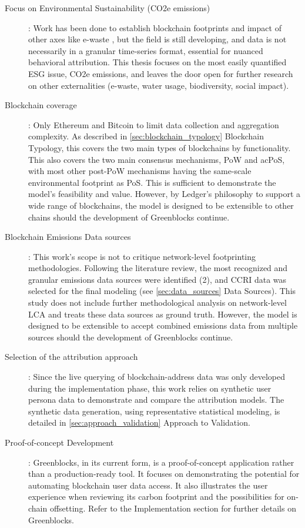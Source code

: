 \documentclass[11pt]{report}
\begin{document}
\begin{description}
    \item [Focus on Environmental Sustainability (CO2e emissions)]: Work has been done to establish blockchain footprints and impact of other axes like e-waste \cite{devriesBitcoinGrowingEwaste2021}, but the field is still developing, and data is not necessarily in a granular time-series format, essential for nuanced behavioral attribution. This thesis focuses on the most easily quantified \ac{ESG} issue, CO2e emissions, and leaves the door open for further research on other externalities (e-waste, water usage, biodiversity, social impact).
    \item [Blockchain coverage]: Only Ethereum and Bitcoin to limit data collection and aggregation complexity. As described in \ref{sec:blockchain_typology} Blockchain Typology, this covers the two main types of blockchains by functionality. This also covers the two main consensus mechanisms, \ac{PoW} and ac{PoS}, with most other post-PoW mechanisms having the same-scale environmental footprint as PoS. This is sufficient to demonstrate the model's feasibility and value. However, by Ledger's philosophy to support a wide range of blockchains, the model is designed to be extensible to other chains should the development of Greenblocks continue.
    \item [Blockchain Emissions Data sources]: This work's scope is not to critique network-level footprinting methodologies. Following the literature review, the most recognized and granular emissions data sources were identified (2), and \ac{CCRI} data was selected for the final modeling (see \ref{sec:data_sources} Data Sources). This study does not include further methodological analysis on network-level LCA and treats these data sources as ground truth. However, the model is designed to be extensible to accept combined emissions data from multiple sources should the development of Greenblocks continue.
    \item [Selection of the attribution approach]: Since the live querying of blockchain-address data was only developed during the implementation phase, this work relies on synthetic user persona data to demonstrate and compare the attribution models. The synthetic data generation, using representative statistical modeling, is detailed in \ref{sec:approach_validation} Approach to Validation.
    \item [Proof-of-concept Development]: Greenblocks, in its current form, is a proof-of-concept application rather than a production-ready tool. It focuses on demonstrating the potential for automating blockchain user data access. It also illustrates the user experience when reviewing its carbon footprint and the possibilities for on-chain offsetting. Refer to the Implementation section for further details on Greenblocks.
\end{description}
\end{document}

